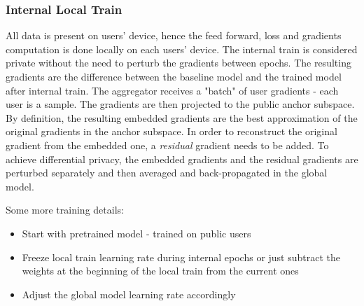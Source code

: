 \documentclass[fourier]{_style/dissertation}
\begin{document}
 \subsubsection{Internal Local Train}
 All data is present on users' device, hence the feed forward, loss and gradients computation is done locally on each users' device.
 The internal train is considered private without the need to perturb the gradients between epochs. The resulting gradients are the difference between the baseline model and the trained model after internal train. The aggregator receives a "batch" of user gradients - each user is a sample. The gradients are then projected to the public anchor subspace. By definition, the resulting embedded gradients are the best approximation of the original gradients in the anchor subspace. In order to reconstruct the original gradient from the embedded one, a \textit{residual} gradient needs to be added. To achieve differential privacy, the embedded gradients and the residual gradients are perturbed separately and then averaged and back-propagated in the global model.

Some more training details:
\begin{itemize}
    \item Start with pretrained model - trained on public users
    \item Freeze local train learning rate during internal epochs or just subtract the weights at the beginning of the local train from the current ones
    \item Adjust the global model learning rate accordingly
\end{itemize}
\end{document}

